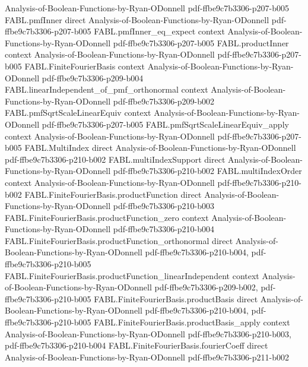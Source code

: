 \begin{theorem}
  {Analysis-of-Boolean-Functions-by-Ryan-ODonnell}
  {pdf-ffbe9c7b3306-p207-b005}
\proofstep
  {FABL.pmfInner}
  {direct}
  {Analysis-of-Boolean-Functions-by-Ryan-ODonnell}
  {pdf-ffbe9c7b3306-p207-b005}
\proofstep
  {FABL.pmfInner_eq_expect}
  {context}
  {Analysis-of-Boolean-Functions-by-Ryan-ODonnell}
  {pdf-ffbe9c7b3306-p207-b005}
\proofstep
  {FABL.productInner}
  {context}
  {Analysis-of-Boolean-Functions-by-Ryan-ODonnell}
  {pdf-ffbe9c7b3306-p207-b005}
\proofstep
  {FABL.FiniteFourierBasis}
  {context}
  {Analysis-of-Boolean-Functions-by-Ryan-ODonnell}
  {pdf-ffbe9c7b3306-p209-b004}
\proofstep
  {FABL.linearIndependent_of_pmf_orthonormal}
  {context}
  {Analysis-of-Boolean-Functions-by-Ryan-ODonnell}
  {pdf-ffbe9c7b3306-p209-b002}
\proofstep
  {FABL.pmfSqrtScaleLinearEquiv}
  {context}
  {Analysis-of-Boolean-Functions-by-Ryan-ODonnell}
  {pdf-ffbe9c7b3306-p207-b005}
\proofstep
  {FABL.pmfSqrtScaleLinearEquiv_apply}
  {context}
  {Analysis-of-Boolean-Functions-by-Ryan-ODonnell}
  {pdf-ffbe9c7b3306-p207-b005}
\proofstep
  {FABL.MultiIndex}
  {direct}
  {Analysis-of-Boolean-Functions-by-Ryan-ODonnell}
  {pdf-ffbe9c7b3306-p210-b002}
\proofstep
  {FABL.multiIndexSupport}
  {direct}
  {Analysis-of-Boolean-Functions-by-Ryan-ODonnell}
  {pdf-ffbe9c7b3306-p210-b002}
\proofstep
  {FABL.multiIndexOrder}
  {context}
  {Analysis-of-Boolean-Functions-by-Ryan-ODonnell}
  {pdf-ffbe9c7b3306-p210-b002}
\proofstep
  {FABL.FiniteFourierBasis.productFunction}
  {direct}
  {Analysis-of-Boolean-Functions-by-Ryan-ODonnell}
  {pdf-ffbe9c7b3306-p210-b003}
\proofstep
  {FABL.FiniteFourierBasis.productFunction_zero}
  {context}
  {Analysis-of-Boolean-Functions-by-Ryan-ODonnell}
  {pdf-ffbe9c7b3306-p210-b004}
\proofstep
  {FABL.FiniteFourierBasis.productFunction_orthonormal}
  {direct}
  {Analysis-of-Boolean-Functions-by-Ryan-ODonnell}
  {pdf-ffbe9c7b3306-p210-b004,
    pdf-ffbe9c7b3306-p210-b005}
\proofstep
  {FABL.FiniteFourierBasis.productFunction_linearIndependent}
  {context}
  {Analysis-of-Boolean-Functions-by-Ryan-ODonnell}
  {pdf-ffbe9c7b3306-p209-b002,
    pdf-ffbe9c7b3306-p210-b005}
\proofstep
  {FABL.FiniteFourierBasis.productBasis}
  {direct}
  {Analysis-of-Boolean-Functions-by-Ryan-ODonnell}
  {pdf-ffbe9c7b3306-p210-b004,
    pdf-ffbe9c7b3306-p210-b005}
\proofstep
  {FABL.FiniteFourierBasis.productBasis_apply}
  {context}
  {Analysis-of-Boolean-Functions-by-Ryan-ODonnell}
  {pdf-ffbe9c7b3306-p210-b003,
    pdf-ffbe9c7b3306-p210-b004}
\proofstep
  {FABL.FiniteFourierBasis.fourierCoeff}
  {direct}
  {Analysis-of-Boolean-Functions-by-Ryan-ODonnell}
  {pdf-ffbe9c7b3306-p211-b002}

\end{theorem}
